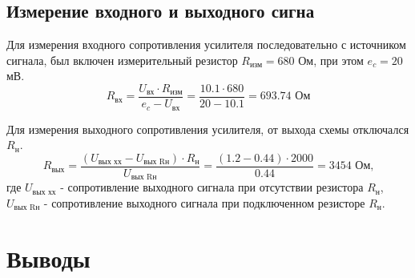 \subsection{Измерение входного и выходного сигна}

Для измерения входного сопротивления усилителя последовательно с источником сигнала, был включен измерительный резистор $R_\text{изм} = 680$ Ом, при этом $e_c = 20$ мВ.
\begin{equation}
R_\text{вх} = \frac{U_\text{вх} \cdot R_\text{изм}}{e_c - U_\text{вх}} = \frac{10.1 \cdot 680}{20 - 10.1} = 693.74 \text{ Ом}
\end{equation}


Для измерения выходного сопротивления усилителя, от выхода схемы отключался $R_\text{н}$.
\begin{equation}
R_\text{вых} = \frac{(U_\text{вых хх} - U_\text{вых Rн}) \cdot R_\text{н}}{U_\text{вых Rн}} = \frac{(1.2 - 0.44) \cdot 2000}{0.44} = 3454 \text{ Ом,}
\end{equation}
где $U_\text{вых хх}$ - сопротивление выходного сигнала при отсутствии резистора $R_\text{н}$, $U_\text{вых Rн}$ - сопротивление выходного сигнала при подключенном резисторе $R_\text{н}$.

%
%
%
%
%

\section{Выводы}


